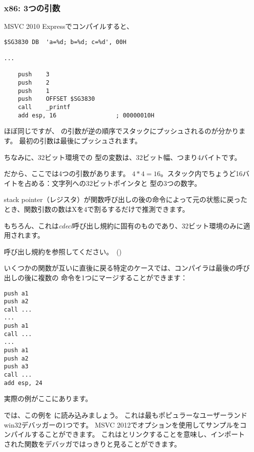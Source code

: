 \subsubsection{x86: 3つの引数}


MSVC 2010 Expressでコンパイルすると、

\begin{lstlisting}[style=customasmx86]
$SG3830	DB	'a=%d; b=%d; c=%d', 00H

...

	push	3
	push	2
	push	1
	push	OFFSET $SG3830
	call	_printf
	add	esp, 16					; 00000010H
\end{lstlisting}

ほぼ同じですが、 \printf の引数が逆の順序でスタックにプッシュされるのが分かります。 最初の引数は最後にプッシュされます。

ちなみに、32ビット環境での \Tint 型の変数は、32ビット幅、つまり4バイトです。

だから、ここでは4つの引数があります。 $4*4 = 16$。スタック内でちょうど16バイトを占める：文字列への32ビットポインタと \Tint 型の3つの数字。

\gls{stack pointer}（\ESP レジスタ）が関数呼び出しの後の命令によって元の状態に戻ったとき、関数引数の数はXを4で割るするだけで推測できます。

もちろん、これは\emph{cdecl}呼び出し規約に固有のものであり、32ビット環境のみに適用されます。 

呼び出し規約を参照してください。~()

いくつかの関数が互いに直後に戻る特定のケースでは、コンパイラは最後の呼び出しの後に複数の 命令を1つにマージすることができます：

\begin{lstlisting}[style=customasmx86]
push a1
push a2
call ...
...
push a1
call ...
...
push a1
push a2
push a3
call ...
add esp, 24
\end{lstlisting}

実際の例がここにあります。



\clearpage
{}
\myindex{\olly}

では、この例を \olly に読み込みましょう。 
これは最もポピュラーなユーザーランドwin32デバッガーの1つです。 
MSVC 2012でオプションを使用してサンプルをコンパイルすることができます。
これはとリンクすることを意味し、インポートされた関数をデバッガではっきりと見ることができます。

